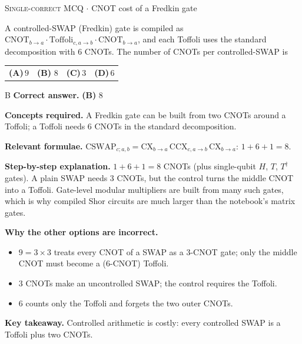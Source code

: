 \documentclass[11pt,a4paper]{article}
\newcommand{\optlabel}[1]{\textbf{(#1)}}
\newcommand{\correctlabel}[1]{\textcolor{okgreen}{\textbf{(#1)}\,\ding{51}}}
\newenvironment{qitem}[1]{\begin{list}{}{\setlength{\leftmargin}{3.3em}\setlength{\labelwidth}{3.1em}%
  \setlength{\labelsep}{0.2em}\setlength{\topsep}{3pt}\setlength{\parsep}{3pt}}\item[\textbf{Q.#1}\hfill]}{\end{list}}
\newcommand{\qsep}{\par\vspace{2pt}{\color{black!15}\hrule}\vspace{4pt}}
\newcommand{\qmeta}[2]{{\footnotesize\color{black!60}\textsc{#1} \;$\cdot$\; #2}\par}
\begin{document}
\begin{qitem}{31}
\qmeta{Single-correct MCQ}{CNOT cost of a Fredkin gate}
A controlled-SWAP (Fredkin) gate is compiled as $\mathrm{CNOT}_{b\to a}\cdot\mathrm{Toffoli}_{c,a\to b}\cdot\mathrm{CNOT}_{b\to a}$, and each Toffoli uses the
standard decomposition with 6 CNOTs. The number of CNOTs per controlled-SWAP is
\par\smallskip\noindent\begin{tabularx}{\linewidth}{@{}*{4}{L}@{}}
\optlabel{A}\,$9$ & \correctlabel{B}\,$8$ & \optlabel{C}\,$3$ & \optlabel{D}\,$6$
\end{tabularx}
\end{qitem}
\begin{solbox}{B}
\textbf{\color{brand}Correct answer.} \textcolor{okgreen}{\textbf{(B)}} $8$

\textbf{\color{brand}Concepts required.} A Fredkin gate can be built from two CNOTs around a Toffoli; a Toffoli needs 6 CNOTs in the standard decomposition.

\textbf{\color{brand}Relevant formulae.} $\mathrm{CSWAP}_{c;a,b} = \mathrm{CX}_{b\to a}\,\mathrm{CCX}_{c,a\to b}\,\mathrm{CX}_{b\to a}$: $1 + 6 + 1 = 8$.

\textbf{\color{brand}Step-by-step explanation.} $1 + 6 + 1 = 8$ CNOTs (plus single-qubit $H$, $T$, $T^\dagger$ gates). A plain SWAP needs $3$ CNOTs, but the control turns the middle CNOT into a Toffoli.
Gate-level modular multipliers are built from many such gates, which is why compiled Shor circuits are much larger than the notebook's matrix gates.

\textbf{\color{brand}Why the other options are incorrect.}
\begin{itemize}[leftmargin=2.4em, itemsep=1pt, topsep=2pt]
\item[\textbf{(A)}] $9 = 3\times3$ treats every CNOT of a SWAP as a 3-CNOT gate; only the middle CNOT must become a (6-CNOT) Toffoli.
\item[\textbf{(C)}] $3$ CNOTs make an uncontrolled SWAP; the control requires the Toffoli.
\item[\textbf{(D)}] $6$ counts only the Toffoli and forgets the two outer CNOTs.
\end{itemize}
\textbf{\color{brand}Key takeaway.} Controlled arithmetic is costly: every controlled SWAP is a Toffoli plus two CNOTs.
\end{solbox}
\qsep
\end{document}

